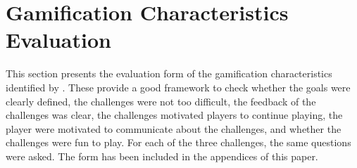 \documentclass{l4proj}
\begin{document}
\section{Gamification Characteristics Evaluation}

This section presents the evaluation form of the gamification characteristics identified by \citet{cugelman_gamification:_2013}.
These provide a good framework to check whether the goals were clearly defined, the challenges were not too difficult,
the feedback of the challenges was clear, the challenges motivated players to continue playing, 
the player were motivated to communicate about the challenges, and whether the challenges were fun to play.
For each of the three challenges, the same questions were asked.
The form has been included in the appendices of this paper.
\end{document}
